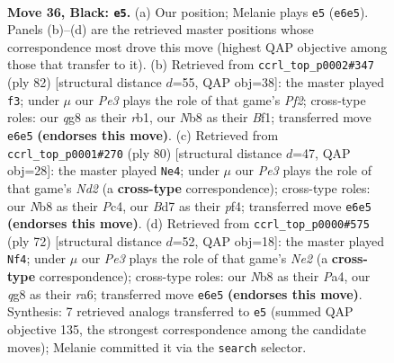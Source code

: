 \documentclass[11pt]{article}
\begin{document}
\clearpage

\begin{figure}[p]\centering
\begin{subfigure}{0.46\textwidth}\centering
\resizebox{\linewidth}{!}{%
\newchessgame
\chessboard[
  setfen={rn4Q1/p2b1N2/2p1p3/P1Pp1k2/1P6/2P5/4K3/R7 b - - 2 36},
  showmover=false,
  pgfstyle=straightmove, color=movearrow, markmove={e6-e5}
]}
\caption{}
\end{subfigure}\hfill
\begin{subfigure}{0.46\textwidth}\centering
\resizebox{\linewidth}{!}{%
\newchessgame
\chessboard[
  setfen={7k/4p2p/2p1Nnp1/2P5/3P2P1/P6P/5P2/1r3BK1 w - - 0 42},
  showmover=false,
  pgfstyle=straightmove, color=movearrow, markmove={f2-f3}
]}
\caption{}
\end{subfigure}
\\[4pt]
\begin{subfigure}{0.46\textwidth}\centering
\resizebox{\linewidth}{!}{%
\newchessgame
\chessboard[
  setfen={8/2rnp1k1/3p3p/R2P2p1/2P2pP1/2K2P1P/3N4/8 w - - 16 41},
  showmover=false,
  pgfstyle=straightmove, color=movearrow, markmove={d2-e4}
]}
\caption{}
\end{subfigure}\hfill
\begin{subfigure}{0.46\textwidth}\centering
\resizebox{\linewidth}{!}{%
\newchessgame
\chessboard[
  setfen={3r3k/8/r5p1/5p1p/PR5P/4P1P1/4NP2/6K1 w - - 0 37},
  showmover=false,
  pgfstyle=straightmove, color=movearrow, markmove={e2-f4}
]}
\caption{}
\end{subfigure}
\caption{\textbf{Move 36, Black: \texttt{e5}.} (a) Our position; Melanie plays \texttt{e5} (\texttt{e6e5}). Panels (b)--(d) are the retrieved master positions whose correspondence most drove this move (highest QAP objective among those that transfer to it). (b) Retrieved from \texttt{ccrl\_top\_p0002\#347} (ply 82) [structural distance $d$=55, QAP obj=38]: the master played \texttt{f3}; under $\mu$ our \emph{Pe3} plays the role of that game's \emph{Pf2}; cross-type roles: our \emph{q}g8 as their \emph{r}b1, our \emph{N}b8 as their \emph{B}f1; transferred move \texttt{e6e5} \textbf{(endorses this move)}. (c) Retrieved from \texttt{ccrl\_top\_p0001\#270} (ply 80) [structural distance $d$=47, QAP obj=28]: the master played \texttt{Ne4}; under $\mu$ our \emph{Pe3} plays the role of that game's \emph{Nd2} (a \textbf{cross-type} correspondence); cross-type roles: our \emph{N}b8 as their \emph{P}c4, our \emph{B}d7 as their \emph{p}f4; transferred move \texttt{e6e5} \textbf{(endorses this move)}. (d) Retrieved from \texttt{ccrl\_top\_p0000\#575} (ply 72) [structural distance $d$=52, QAP obj=18]: the master played \texttt{Nf4}; under $\mu$ our \emph{Pe3} plays the role of that game's \emph{Ne2} (a \textbf{cross-type} correspondence); cross-type roles: our \emph{N}b8 as their \emph{P}a4, our \emph{q}g8 as their \emph{r}a6; transferred move \texttt{e6e5} \textbf{(endorses this move)}. Synthesis: 7 retrieved analogs transferred to \texttt{e5} (summed QAP objective 135, the strongest correspondence among the candidate moves); Melanie committed it via the \texttt{search} selector.}
\label{fig:thought-m71}
\end{figure}
\end{document}
